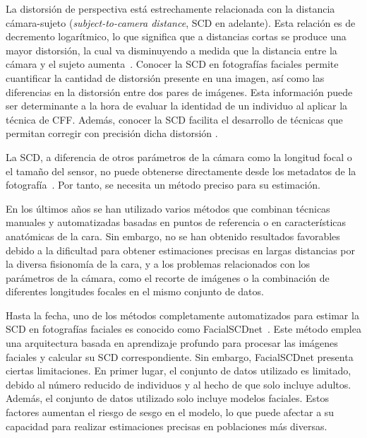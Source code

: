 La distorsión de perspectiva está estrechamente relacionada con la distancia cámara-sujeto (\textit{subject-to-camera distance}, SCD en adelante). Esta relación es de decremento logarítmico, lo que significa que a distancias cortas se produce una mayor distorsión, la cual va disminuyendo a medida que la distancia entre la cámara y el sujeto aumenta~\cite{55}. Conocer la SCD en fotografías faciales permite cuantificar la cantidad de distorsión presente en una imagen, así como las diferencias en la distorsión entre dos pares de imágenes. Esta información puede ser determinante a la hora de evaluar la identidad de un individuo al aplicar la técnica de CFF. Además, conocer la SCD facilita el desarrollo de técnicas que permitan corregir con precisión dicha distorsión \cite{16}.


La SCD, a diferencia de otros parámetros de la cámara como la longitud focal o el tamaño del sensor, no puede obtenerse directamente desde los metadatos de la fotografía~\cite{8}. Por tanto, se necesita un método preciso para su estimación. 

En los últimos años se han utilizado varios métodos que combinan técnicas manuales y automatizadas basadas en puntos de referencia o en características anatómicas de la cara\cite{28,30}. Sin embargo, no se han obtenido resultados favorables debido a la dificultad para obtener estimaciones precisas en largas distancias por la diversa fisionomía de la cara, y a los problemas relacionados con los parámetros de la cámara, como el recorte de imágenes o la combinación de diferentes longitudes focales en el mismo conjunto de datos.

Hasta la fecha, uno de los métodos completamente automatizados para estimar la SCD en fotografías faciales es conocido como FacialSCDnet~\cite{14}. Este método emplea una arquitectura basada en aprendizaje profundo para procesar las imágenes faciales y calcular su SCD correspondiente.
Sin embargo, FacialSCDnet presenta ciertas limitaciones. En primer lugar, el conjunto de datos utilizado es limitado, debido al número reducido de individuos y al hecho de que solo incluye adultos. Además, el conjunto de datos utilizado solo incluye modelos faciales. Estos factores aumentan el riesgo de sesgo en el modelo, lo que puede afectar a su capacidad para realizar estimaciones precisas en poblaciones más diversas.

